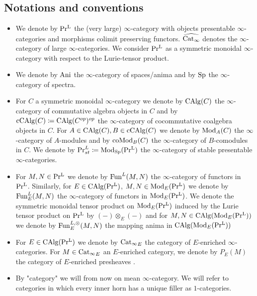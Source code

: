 \subsection{Notations and conventions}
\begin{itemize}
    \item We denote by $\operatorname{Pr^{L}}$ the (very large) $\infty$-category with objects presentable $\infty$-categories and morphisms colimit preserving functors. $\widehat{\operatorname{Cat_{\infty}}}$ denotes the $\infty$-category of large $\infty$-categories. We consider $\operatorname{Pr^{L}}$ as a symmetric monoidal $\infty$-category with respect to the Lurie-tensor product. 
    \item 
    We denote by $\operatorname{Ani}$ the $\infty$-category of spaces/anima and by $\operatorname{Sp}$ the $\infty$-category of spectra.

    \item For $C$ a symmetric monoidal $\infty$-category we denote by $\operatorname{CAlg}(C)$ the $\infty$-category of commutative algebra objects in $C$ and by $\operatorname{cCAlg}(C)\coloneq \operatorname{CAlg}(C^{op})^{op}$ the $\infty$-category of cocommutative coalgebra objects in $C$. For $A\in \operatorname{CAlg}(C), B\in \operatorname{cCAlg}(C)$ we denote by $\operatorname{Mod}_A(C)$ the $\infty$-category of $A$-modules and by $\operatorname{coMod}_B(C)$ the $\infty$-category of $B$-comodules in $C$. We denote by $\Pr_{st}^L\coloneq\operatorname{Mod}_{\operatorname{Sp}}(\operatorname{Pr^{L}})$ the $\infty$-category of stable presentable $\infty$-categories.

    \item For $M,N \in \operatorname{Pr^{L}}$ we denote by $\operatorname{Fun}^L(M,N)$ the $\infty$-category of functors in $\operatorname{Pr^{L}}$. Similarly, for $E \in \operatorname{CAlg}(\operatorname{Pr^{L}})$, $M,N \in \operatorname{Mod}_E(\operatorname{Pr^{L}})$ we denote by  $\operatorname{Fun}_E^L(M,N)$ the $\infty$-category of functors in $\operatorname{Mod}_E(\operatorname{Pr^{L}})$.  We denote the symmetric monoidal tensor product on $\operatorname{Mod}_E(\operatorname{Pr^{L}})$ induced by the Lurie tensor product on $\operatorname{Pr^{L}}$ by $(-)\otimes_E (-)$ and for  $M,N \in \operatorname{CAlg}(\operatorname{Mod}_E(\operatorname{Pr^{L}}))$ we denote by $\operatorname{Fun}_E^{L,\otimes}(M,N)$ the mapping anima  in $\operatorname{CAlg}(\operatorname{Mod}_E(\operatorname{Pr^{L}}))$

    \item For $E \in \operatorname{CAlg}(\operatorname{Pr^{L}})$ we denote by $\operatorname{Cat_{\infty}}_E$ the category of $E$-enriched $\infty$-categories. For $M\in \operatorname{Cat_{\infty}}_E$ an $E$-enriched category, we denote by $P_{E}(M)$ the category of $E$-enriched presheaves \Cite[Definition C.2.8]{heyer20246}.

    \item By "category" we will from now on mean $\infty$-category. We will refer to categories in which every inner horn has a unique filler as $1$-categories.

    
\end{itemize}  




